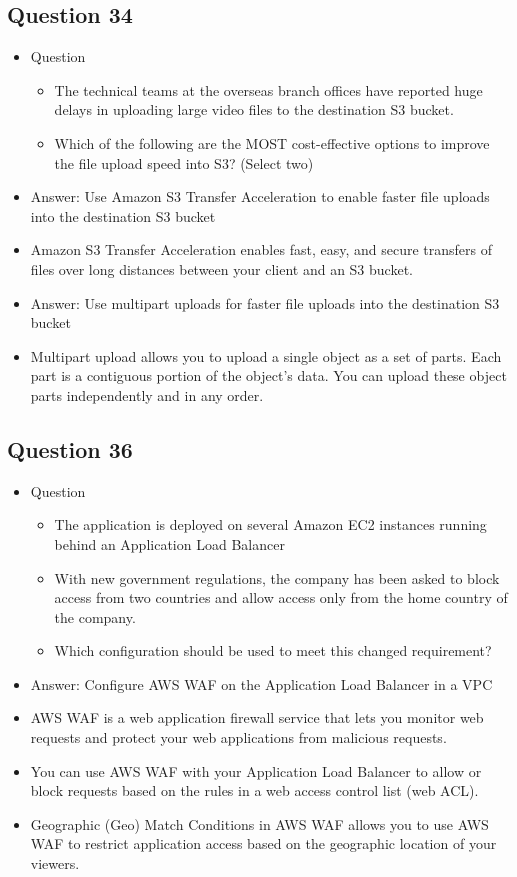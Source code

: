 \documentclass[]{scrartcl}
\begin{document}
\subsection{Question 34}
\begin{itemize}
	\item Question
	\begin{itemize}
		\item The technical teams at the overseas branch offices have reported huge delays in uploading large video files to the destination S3 bucket.
		\item Which of the following are the MOST cost-effective options to improve the file upload speed into S3? (Select two)
	\end{itemize}
	\item Answer: Use Amazon S3 Transfer Acceleration to enable faster file uploads into the destination S3 bucket
	\item Amazon S3 Transfer Acceleration enables fast, easy, and secure transfers of files over long distances between your client and an S3 bucket.
	\item Answer: Use multipart uploads for faster file uploads into the destination S3 bucket
	\item Multipart upload allows you to upload a single object as a set of parts. Each part is a contiguous portion of the object's data. You can upload these object parts independently and in any order. 
\end{itemize}

\subsection{Question 36}
\begin{itemize}
	\item Question
	\begin{itemize}
		\item The application is deployed on several Amazon EC2 instances running behind an Application Load Balancer
		\item With new government regulations, the company has been asked to block access from two countries and allow access only from the home country of the company.
		\item Which configuration should be used to meet this changed requirement?
	\end{itemize}
	\item Answer: Configure AWS WAF on the Application Load Balancer in a VPC
	\item AWS WAF is a web application firewall service that lets you monitor web requests and protect your web applications from malicious requests. 
	\item You can use AWS WAF with your Application Load Balancer to allow or block requests based on the rules in a web access control list (web ACL). 
	\item Geographic (Geo) Match Conditions in AWS WAF allows you to use AWS WAF to restrict application access based on the geographic location of your viewers. 
\end{itemize}
\end{document}
